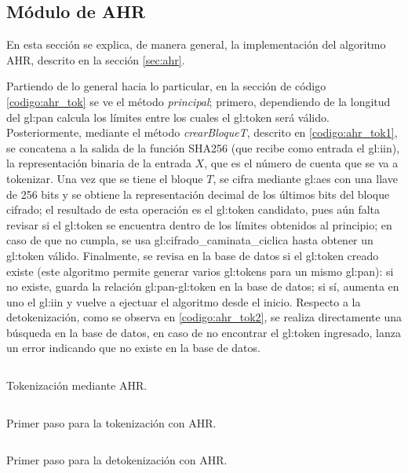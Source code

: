 %
%
%

\subsection{Módulo de AHR}
En esta sección se explica, de manera general, la implementación del algoritmo
AHR, descrito en la sección \ref{sec:ahr}.

Partiendo de lo general hacia lo particular, en la sección de código
\ref{codigo:ahr_tok} se ve el método \textit{principal}; primero, dependiendo de
la longitud del \gls{gl:pan} calcula los límites entre los cuales el
\gls{gl:token} será válido. Posteriormente, mediante el método
\textit{crearBloqueT}, descrito en \ref{codigo:ahr_tok1}, se concatena a la
salida de la función SHA256 (que recibe como entrada el \gls{gl:iin}), la
representación binaria de la entrada $X$, que es el número de cuenta que se
va a tokenizar. Una vez que se tiene el bloque $T$, se cifra mediante
\gls{gl:aes} con una llave de 256 bits y se obtiene la representación decimal
de los últimos bits del bloque cifrado; el resultado de esta operación es
el \gls{gl:token} candidato, pues aún falta revisar si el \gls{gl:token} se
encuentra dentro de los límites obtenidos al principio; en caso de que no
cumpla, se usa \gls{gl:cifrado_caminata_ciclica} hasta obtener un \gls{gl:token}
válido. Finalmente, se revisa en la base de datos si el \gls{gl:token} creado
existe (este algoritmo permite generar varios \glspl{gl:token} para un mismo
\gls{gl:pan}): si no existe, guarda la relación \gls{gl:pan}-\gls{gl:token} en
la base de datos; si sí, aumenta en uno el \gls{gl:iin} y vuelve a ejectuar
el algoritmo desde el inicio. Respecto a la detokenización, como se observa en
\ref{codigo:ahr_tok2}, se realiza directamente una búsqueda en la base de datos,
en caso de no encontrar el \gls{gl:token} ingresado, lanza un error indicando
que no existe en la base de datos.

\begin{listing}
  \inputminted[firstline=284, lastline=328]
    {c++}{../implementaciones/ahr/ahr.cpp}
  \caption{Tokenización mediante AHR.}
  \label{codigo:ahr_tok}
\end{listing}

\begin{listing}
  \inputminted[firstline=193, lastline=223]
    {c++}{../implementaciones/ahr/ahr.cpp}
  \caption{Primer paso para la tokenización con AHR.}
  \label{codigo:ahr_tok1}
\end{listing}

\begin{listing}
  \inputminted[firstline=360, lastline=372]
    {c++}{../implementaciones/ahr/ahr.cpp}
  \caption{Primer paso para la detokenización con AHR.}
  \label{codigo:ahr_tok2}
\end{listing}
